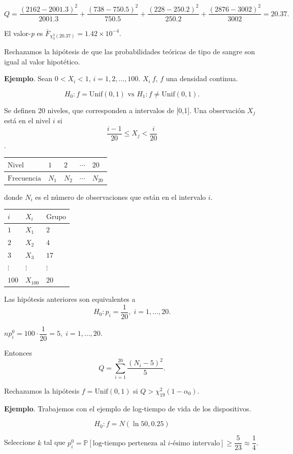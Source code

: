 \documentclass[
  12pt,
]{book}
\begin{document}
\[Q = \dfrac{(2162-2001.3)^2}{2001.3} + \dfrac{(738-750.5)^2}{750.5} + \dfrac{(228-250.2)^2}{250.2} + \dfrac{(2876-3002)^2}{3002} = 20.37.\]

El valor-\emph{p} es \(\bar F_{\chi^2_3(20.37)} = 1.42\times 10^{-4}\).

Rechazamos la hipótesis de que las probabilidades teóricas de tipo de sangre son igual al valor hipotético.

\textbf{Ejemplo}. Sean \(0<X_i<1\), \(i=1,2,\dots,100\). \(X_i~f\), \(f\) una densidad continua.

\[H_0: f=\text{Unif}(0,1) \text{ vs } H_1: f \ne\text{Unif}(0,1). \]

Se definen 20 niveles, que corresponden a intervalos de {[}0,1{]}. Una observación \(X_j\) está en el nivel \(i\) si
\[\dfrac{i-1}{20}\leq X_j <\dfrac{i}{20}\].

\begin{longtable}[]{@{}lllll@{}}
\toprule
\(\text{Nivel}\) & \(1\) & \(2\) & \(\cdots\) & \(20\)\tabularnewline
\midrule
\endhead
\(\text{Frecuencia}\) & \(N_1\) & \(N_2\) & \(\cdots\) & \(N_{20}\)\tabularnewline
\bottomrule
\end{longtable}

donde \(N_i\) es el número de observaciones que están en el intervalo \(i\).

\begin{longtable}[]{@{}lll@{}}
\toprule
\(i\) & \(X_i\) & \(\text{Grupo}\)\tabularnewline
\midrule
\endhead
\(1\) & \(X_1\) & \(2\)\tabularnewline
\(2\) & \(X_2\) & \(4\)\tabularnewline
\(3\) & \(X_3\) & \(17\)\tabularnewline
\(\vdots\) & \(\vdots\) & \(\vdots\)\tabularnewline
\(100\) & \(X_{100}\) & \(20\)\tabularnewline
\bottomrule
\end{longtable}

Las hipótesis anteriores son equivalentes a
\[H_0: p_i = \dfrac{1}{20}, \;i=1,\dots,20.\]

\(np_i^0 = 100\cdot\dfrac 1{20} = 5,\;i = 1,\dots,20\).

Entonces
\[Q = \sum_{i=1}^{20}\dfrac{(N_i-5)^2}{5}.\]

Rechazamos la hipótesis \(f = \text{Unif}(0,1)\) si \(Q>\chi^2_{19}(1-\alpha_0)\).

\textbf{Ejemplo}. Trabajemos con el ejemplo de log-tiempo de vida de los dispositivos.

\[H_0: f = N(\ln50,0.25)\]

Seleccione \(k\) tal que \(p_i^0 = \mathbb P[\text{log-tiempo perteneza al }i\text{-ésimo intervalo}]\geq \dfrac 5{23}\approx \dfrac 14.\)
\end{document}
